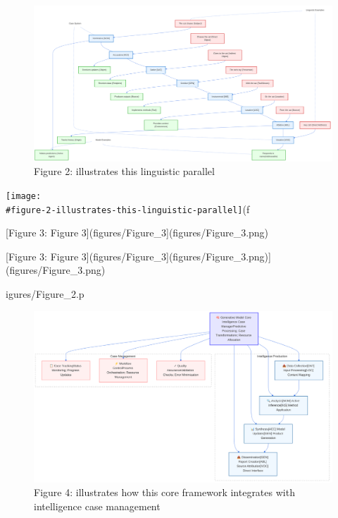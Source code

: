 \documentclass[
  11pt,
  letterpaper,
]{article}
\begin{document}
\begin{figure}
\centering
\includegraphics{figures/Figure_2.png}
\caption{Figure 2: illustrates this linguistic parallel}
\end{figure}

\texttt{[image: \\\#figure-2-illustrates-this-linguistic-parallel]}(f

{[}Figure 3: Figure 3{]}(figures/Figure\_3{]}(figures/Figure\_3.png)

{[}Figure 3: Figure
3{]}(figures/Figure\_3{]}(figures/Figure\_3.png){]}(figures/Figure\_3.png)

igures/Figure\_2.p

\begin{figure}
\centering
\includegraphics{figures/Figure_4.png}
\caption{Figure 4: illustrates how this core framework integrates with
intelligence case management}
\end{figure}
\end{document}
